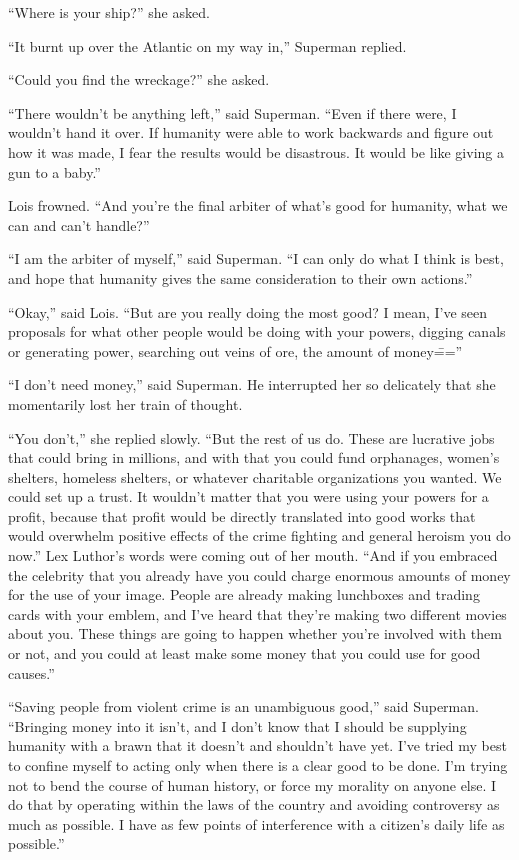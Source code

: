 \documentclass[ebook,12pt]{memoir}
\begin{document}
``Where is your ship?'' she asked.

``It burnt up over the Atlantic on my way in,'' Superman replied.

``Could you find the wreckage?'' she asked.

``There wouldn't be anything left,'' said Superman. ``Even if there
were, I wouldn't hand it over. If humanity were able to work backwards
and figure out how it was made, I fear the results would be disastrous.
It would be like giving a gun to a baby.''

Lois frowned. ``And you're the final arbiter of what's good for
humanity, what we can and can't handle?''

``I am the arbiter of myself,'' said Superman. ``I can only do what I
think is best, and hope that humanity gives the same consideration to
their own actions.''

``Okay,'' said Lois. ``But are you really doing the most good? I mean,
I've seen proposals for what other people would be doing with your
powers, digging canals or generating power, searching out veins of ore,
the amount of money\===''

``I don't need money,'' said Superman. He interrupted her so delicately
that she momentarily lost her train of thought.

``You don't,'' she replied slowly. ``But the rest of us do. These are
lucrative jobs that could bring in millions, and with that you could
fund orphanages, women's shelters, homeless shelters, or whatever
charitable organizations you wanted. We could set up a trust. It
wouldn't matter that you were using your powers for a profit, because
that profit would be directly translated into good works that would
overwhelm positive effects of the crime fighting and general heroism you
do now.'' Lex Luthor's words were coming out of her mouth. ``And if you
embraced the celebrity that you already have you could charge enormous
amounts of money for the use of your image. People are already making
lunchboxes and trading cards with your emblem, and I've heard that
they're making two different movies about you. These things are going to
happen whether you're involved with them or not, and you could at least
make some money that you could use for good causes.''

``Saving people from violent crime is an unambiguous good,'' said
Superman. ``Bringing money into it isn't, and I don't know that I should
be supplying humanity with a brawn that it doesn't and shouldn't have
yet. I've tried my best to confine myself to acting only when there is a
clear good to be done. I'm trying not to bend the course of human
history, or force my morality on anyone else. I do that by operating
within the laws of the country and avoiding controversy as much as
possible. I have as few points of interference with a citizen's daily
life as possible.''
\end{document}
